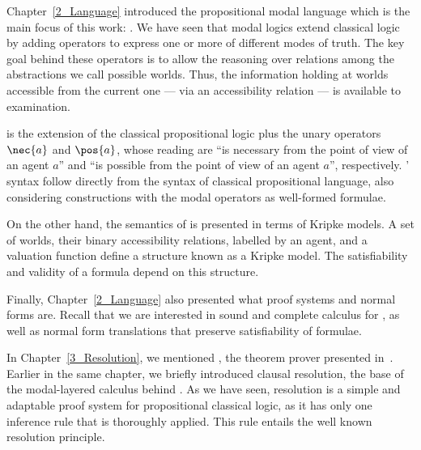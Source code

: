 
Chapter~\ref{2_Language} introduced the propositional modal language which is
the main focus of this work: . We have seen that modal logics
extend classical logic by adding operators to express one or more of different
modes of truth.  The key goal behind these operators is to allow the reasoning
over relations among the abstractions we call possible worlds. Thus, the
information holding at worlds accessible from the current one --- via an
accessibility relation --- is available to examination.  

 is the extension of the classical propositional logic plus the
unary operators $\nec{a}$ and $\pos{a}$, whose reading are ``is necessary from
the point of view of an agent $a$'' and ``is possible from the point of view of
an agent $a$'', respectively. ' syntax follow directly from the
syntax of classical propositional language, also considering constructions with
the modal operators as well-formed formulae.

On the other hand, the semantics of  is presented in terms of
Kripke models. A set of worlds, their binary accessibility relations, labelled
by an agent, and a valuation function define a structure known as a Kripke
model. The satisfiability and validity of a formula depend on this
structure.

Finally, Chapter~\ref{2_Language} also presented what proof systems and normal
forms are. Recall that we are interested in sound and complete calculus for
, as well as normal form translations that preserve
satisfiability of formulae.

In Chapter~\ref{3_Resolution}, we mentioned \ksp, the theorem prover presented
in~\cite{Nalon2016}. Earlier in the same chapter, we briefly introduced clausal
resolution, the base of the modal-layered calculus behind \ksp. As we have seen,
resolution is a simple and adaptable proof system for propositional classical
logic, as it has only one inference rule that is thoroughly applied. This rule
entails the well known resolution principle.

